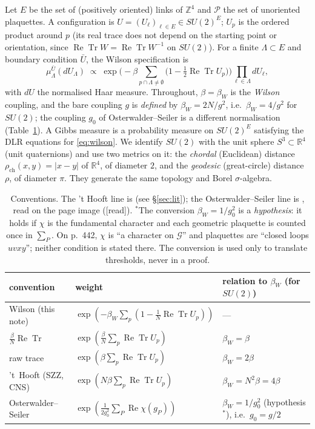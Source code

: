 \documentclass[11pt,a4paper]{article}
\theoremstyle{remark}
\theoremstyle{definition}
\newcommand{\R}{\mathbb{R}}
\newcommand{\Z}{\mathbb{Z}}
\newcommand{\ReTr}{\operatorname{Re}\operatorname{Tr}}
\newcommand{\st}[1]{\textsf{[#1]}}
\newcommand{\rch}{\rho_{\mathrm{ch}}}
\begin{document}
Let $E$ be the set of (positively oriented) links of $\Z^4$ and $\mathcal P$ the set of unoriented plaquettes.
A configuration is $U=(U_\ell)_{\ell\in E}\in SU(2)^E$; $U_p$ is the ordered product around $p$ (its
real trace does not depend on the starting point or orientation, since $\ReTr W=\ReTr W^{-1}$ on $SU(2)$).
For a finite $\Lambda\subset E$ and boundary condition $\bar U$, the Wilson specification is
\begin{equation}\label{eq:wilson}
  \mu^{\bar U}_{\Lambda}(dU_\Lambda)\;\propto\;
  \exp\Big(-\beta\sum_{p\cap\Lambda\neq\emptyset}\big(1-\tfrac12\ReTr U_p\big)\Big)\prod_{\ell\in\Lambda}dU_\ell ,
\end{equation}
with $dU$ the normalised Haar measure. Throughout, $\beta=\beta_W$ is the \emph{Wilson} coupling, and
the bare coupling $g$ is \emph{defined} by $\beta_W=2N/g^2$, i.e.\ $\beta_W=4/g^2$ for $SU(2)$; the coupling
$g_0$ of Osterwalder--Seiler is a different normalisation (Table~\ref{tab:conv}). A Gibbs measure is a probability measure on $SU(2)^E$ satisfying the
DLR equations for \eqref{eq:wilson}.
We identify $SU(2)$ with the unit sphere $S^3\subset\R^4$ (unit quaternions) and use two metrics on it: the
\emph{chordal} (Euclidean) distance $\rch(x,y)=|x-y|$ of $\R^4$, of diameter $2$, and the \emph{geodesic}
(great-circle) distance $\rho$, of diameter $\pi$. They generate the same topology and Borel $\sigma$-algebra.

\begin{table}[htbp]
\centering\small
\begin{tabular}{lll}
\toprule
convention & weight & relation to $\beta_W$ (for $SU(2)$)\\
\midrule
Wilson (this note) & $\exp(-\beta_W\sum_p(1-\frac1N\ReTr U_p))$ & ---\\
$\frac{\beta}{N}\ReTr$ & $\exp(\frac{\beta}{N}\sum_p \ReTr U_p)$ & $\beta_W=\beta$\\
raw trace & $\exp(\beta\sum_p\ReTr U_p)$ & $\beta_W=2\beta$\\
't~Hooft (SZZ, CNS) & $\exp(N\beta\sum_p\ReTr U_p)$ & $\beta_W=N^2\beta=4\beta$\\
Osterwalder--Seiler & $\exp(\frac{1}{2g_0^2}\sum_P \operatorname{Re}\chi(g_P))$ & $\beta_W=1/g_0^2$ (hypothesis${}^\ast$), i.e.\ $g_0=g/2$\\
\bottomrule
\end{tabular}
\caption{Conventions. The 't Hooft line is \cite[(1.2)]{SZZ23} (see \S\ref{sec:lit}); the
Osterwalder--Seiler line is \cite[(2.1)--(2.2), p.~442]{OS78}, read on the page image
(\st{read}). ${}^\ast$The conversion $\beta_W=1/g_0^2$ is a \emph{hypothesis}: it holds if $\chi$ is the
fundamental character and each geometric plaquette is counted once in $\sum_P$. On p.~442, $\chi$ is
``a character on $\mathcal G$'' and plaquettes are ``closed loops $uvxy$''; neither condition is stated
there. The conversion is used only to translate thresholds, never in a proof.}
\label{tab:conv}
\end{table}
\end{document}
